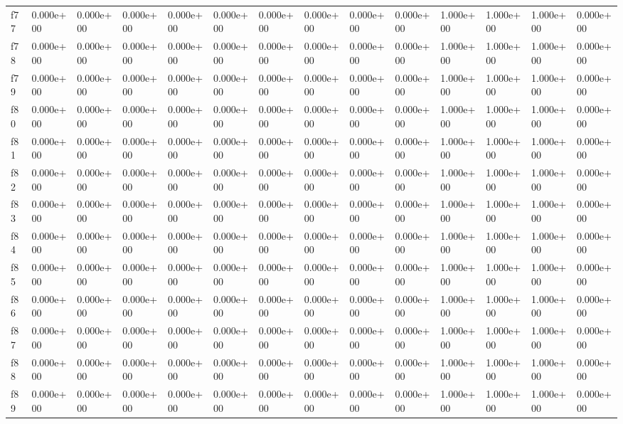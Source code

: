 \begin{table}
\begin{tabular}{llllllllllllll}
f77 & 0.000e+00 & 0.000e+00 & 0.000e+00 & 0.000e+00 & 0.000e+00 & 0.000e+00 & 0.000e+00 & 0.000e+00 & 0.000e+00 & 1.000e+00 & 1.000e+00 & 1.000e+00 & 0.000e+00 \\
f78 & 0.000e+00 & 0.000e+00 & 0.000e+00 & 0.000e+00 & 0.000e+00 & 0.000e+00 & 0.000e+00 & 0.000e+00 & 0.000e+00 & 1.000e+00 & 1.000e+00 & 1.000e+00 & 0.000e+00 \\
f79 & 0.000e+00 & 0.000e+00 & 0.000e+00 & 0.000e+00 & 0.000e+00 & 0.000e+00 & 0.000e+00 & 0.000e+00 & 0.000e+00 & 1.000e+00 & 1.000e+00 & 1.000e+00 & 0.000e+00 \\
f80 & 0.000e+00 & 0.000e+00 & 0.000e+00 & 0.000e+00 & 0.000e+00 & 0.000e+00 & 0.000e+00 & 0.000e+00 & 0.000e+00 & 1.000e+00 & 1.000e+00 & 1.000e+00 & 0.000e+00 \\
f81 & 0.000e+00 & 0.000e+00 & 0.000e+00 & 0.000e+00 & 0.000e+00 & 0.000e+00 & 0.000e+00 & 0.000e+00 & 0.000e+00 & 1.000e+00 & 1.000e+00 & 1.000e+00 & 0.000e+00 \\
f82 & 0.000e+00 & 0.000e+00 & 0.000e+00 & 0.000e+00 & 0.000e+00 & 0.000e+00 & 0.000e+00 & 0.000e+00 & 0.000e+00 & 1.000e+00 & 1.000e+00 & 1.000e+00 & 0.000e+00 \\
f83 & 0.000e+00 & 0.000e+00 & 0.000e+00 & 0.000e+00 & 0.000e+00 & 0.000e+00 & 0.000e+00 & 0.000e+00 & 0.000e+00 & 1.000e+00 & 1.000e+00 & 1.000e+00 & 0.000e+00 \\
f84 & 0.000e+00 & 0.000e+00 & 0.000e+00 & 0.000e+00 & 0.000e+00 & 0.000e+00 & 0.000e+00 & 0.000e+00 & 0.000e+00 & 1.000e+00 & 1.000e+00 & 1.000e+00 & 0.000e+00 \\
f85 & 0.000e+00 & 0.000e+00 & 0.000e+00 & 0.000e+00 & 0.000e+00 & 0.000e+00 & 0.000e+00 & 0.000e+00 & 0.000e+00 & 1.000e+00 & 1.000e+00 & 1.000e+00 & 0.000e+00 \\
f86 & 0.000e+00 & 0.000e+00 & 0.000e+00 & 0.000e+00 & 0.000e+00 & 0.000e+00 & 0.000e+00 & 0.000e+00 & 0.000e+00 & 1.000e+00 & 1.000e+00 & 1.000e+00 & 0.000e+00 \\
f87 & 0.000e+00 & 0.000e+00 & 0.000e+00 & 0.000e+00 & 0.000e+00 & 0.000e+00 & 0.000e+00 & 0.000e+00 & 0.000e+00 & 1.000e+00 & 1.000e+00 & 1.000e+00 & 0.000e+00 \\
f88 & 0.000e+00 & 0.000e+00 & 0.000e+00 & 0.000e+00 & 0.000e+00 & 0.000e+00 & 0.000e+00 & 0.000e+00 & 0.000e+00 & 1.000e+00 & 1.000e+00 & 1.000e+00 & 0.000e+00 \\
f89 & 0.000e+00 & 0.000e+00 & 0.000e+00 & 0.000e+00 & 0.000e+00 & 0.000e+00 & 0.000e+00 & 0.000e+00 & 0.000e+00 & 1.000e+00 & 1.000e+00 & 1.000e+00 & 0.000e+00 \\

\end{tabular}
\end{table}
